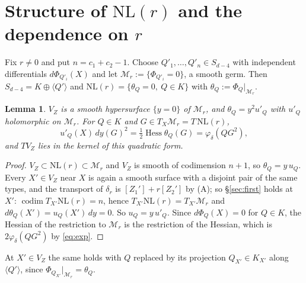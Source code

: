\documentclass[11pt]{article}
\numberwithin{equation}{section}
\newtheorem{lemma}[theorem]{Lemma}
\theoremstyle{remark}
\newcommand{\NL}{\mathrm{NL}}
\newcommand{\VZ}{V_Z}
\newcommand{\cM}{\mathcal{M}}
\newcommand{\Hess}{\operatorname{Hess}}
\newcommand{\codim}{\operatorname{codim}}
\begin{document}
\section{Structure of \texorpdfstring{$\NL(r)$}{NL(r)} and the dependence on \texorpdfstring{$r$}{r}}\label{sec:struct}

Fix $r\neq0$ and put $n=c_1+c_2-1$. Choose $Q'_1,\dots,Q'_n\in S_{d-4}$ with independent differentials
$d\Phi_{Q'_i}(X)$ and let $\cM_r:=\{\Phi_{Q'_i}=0\}$, a smooth germ. Then $S_{d-4}=K\oplus\langle Q'\rangle$ and
$\NL(r)=\{\theta_Q=0,\ Q\in K\}$ with $\theta_Q:=\Phi_Q|_{\cM_r}$.

\begin{lemma}\label{lem:struct}
$\VZ$ is a smooth hypersurface $\{y=0\}$ of $\cM_r$, and $\theta_Q=y^2u'_Q$ with $u'_Q$ holomorphic on $\cM_r$.
For $Q\in K$ and $G\in T_X\cM_r=T\,\NL(r)$,
\begin{equation}\label{eq:hess}
u'_Q(X)\,dy(G)^2=\tfrac12\Hess\theta_Q(G)=\varphi_\delta(QG^2),
\end{equation}
and $T\VZ$ lies in the kernel of this quadratic form.
\end{lemma}
\begin{proof}
$\VZ\subset\NL(r)\subset\cM_r$ and $\VZ$ is smooth of codimension $n+1$, so $\theta_Q=y\,u_Q$. Every $X'\in\VZ$
near $X$ is again a smooth surface with a disjoint pair of the same types, and the transport of $\delta_r$ is
$[Z_1']+r[Z_2']$ by (A); so \S\ref{sec:first} holds at $X'$: $\codim T_{X'}\NL(r)=n$, hence
$T_{X'}\NL(r)=T_{X'}\cM_r$ and $d\theta_Q(X')=u_Q(X')\,dy=0$. So $u_Q=y\,u'_Q$. Since $d\Phi_Q(X)=0$ for
$Q\in K$, the Hessian of the restriction to $\cM_r$ is the restriction of the Hessian, which is
$2\varphi_\delta(QG^2)$ by \eqref{eq:exp}.
\end{proof}

At $X'\in\VZ$ the same holds with $Q$ replaced by its projection $Q_{X'}\in K_{X'}$ along $\langle Q'\rangle$,
since $\Phi_{Q_{X'}}|_{\cM_r}=\theta_Q$.
\end{document}
